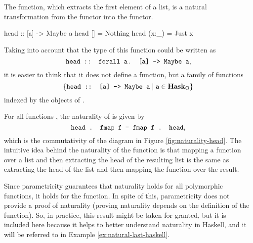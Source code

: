 \begin{example}

  \label{ex:natural-head-haskell}


  The  function, which extracts the first element of
  a list, is a natural transformation from the \texthaskell{[]}
  functor into the  functor.
  \begin{codehaskell}
    head :: [a] -> Maybe a
    head []    = Nothing
    head (x:_) = Just x
  \end{codehaskell}

  Taking into account that the type of this function could be written
  as
  \begin{equation*}
    \text{\texttt{head :: forall a. [a] -> Maybe a}}
    \text{,}
  \end{equation*}
  it is easier to think that it does not define a function, but a family
  of functions
  \begin{equation*}
    \{\text{\texttt{head :: [a] -> Maybe a}} \mid
    \text{\texttt{a}} \in \mathcal{\mathbf{Hask}}_{\operatorname{O}}\}
  \end{equation*}
  indexed by the objects of \hask.

  For all functions , the naturality of
   is given by
  \begin{equation}
    \label{eq:naturality-head}
    \text{\texttt{head . fmap f = fmap f . head}}
    \text{,}
  \end{equation}
  which is the commutativity of the diagram in Figure
  \ref{fig:naturality-head}. The intuitive idea behind the naturality
  of the  function is that mapping a function
   over a list and then extracting the head of the
  resulting list is the same as extracting the head of the list and
  then mapping the function  over the result.

  Since parametricity guarantees that naturality holds for all
  polymorphic functions, it holds for the  function.
  In spite of this, parametricity does not provide a proof of
  naturality (proving naturality depends on the definition of the
  function). So, in practice, this result might be taken for granted,
  but it is included here because it helps to better understand
  naturality in Haskell, and it will be referred to in Example
  \ref{ex:natural-last-haskell}.


\end{example}
